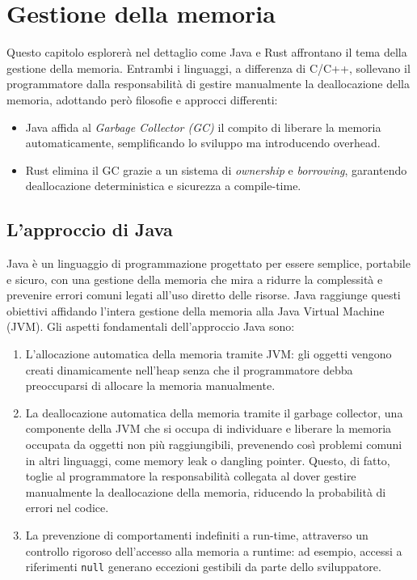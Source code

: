 
\chapter{Gestione della memoria}
Questo capitolo esplorerà nel dettaglio come Java e Rust affrontano il tema della gestione della memoria. Entrambi i linguaggi, a differenza di C/C++, sollevano il programmatore dalla responsabilità di gestire manualmente la deallocazione della memoria, adottando però filosofie e approcci differenti:
\begin{itemize}
    \item Java affida al \textit{Garbage Collector (GC)} il compito di liberare la memoria automaticamente, semplificando lo sviluppo ma introducendo overhead. 
    \item Rust elimina il GC grazie a un sistema di \textit{ownership} e \textit{borrowing}, garantendo deallocazione deterministica e sicurezza a compile-time. 
\end{itemize}
\section{L'approccio di Java}
Java è un linguaggio di programmazione progettato per essere semplice, portabile e sicuro, con una gestione della memoria che mira a ridurre la complessità e prevenire errori comuni legati all'uso diretto delle risorse. Java raggiunge questi obiettivi affidando l'intera gestione della memoria alla Java Virtual Machine (JVM). Gli aspetti fondamentali dell'approccio Java sono:

\begin{enumerate}
\item L'allocazione automatica della memoria tramite JVM: gli oggetti vengono creati dinamicamente nell'heap senza che il programmatore debba preoccuparsi di allocare la memoria manualmente. 
\item La deallocazione automatica della memoria tramite il garbage collector, una componente della JVM che si occupa di individuare e liberare la memoria occupata da oggetti non più raggiungibili, prevenendo così problemi comuni in altri linguaggi, come memory leak o dangling pointer. Questo, di fatto, toglie al programmatore la responsabilità collegata al dover gestire manualmente la deallocazione della memoria, riducendo la probabilità di errori nel codice.
\item La prevenzione di comportamenti indefiniti a run-time, attraverso un controllo rigoroso dell'accesso alla memoria a runtime: ad esempio, accessi a riferimenti \texttt{null} generano eccezioni gestibili da parte dello sviluppatore. 
\end{enumerate}

